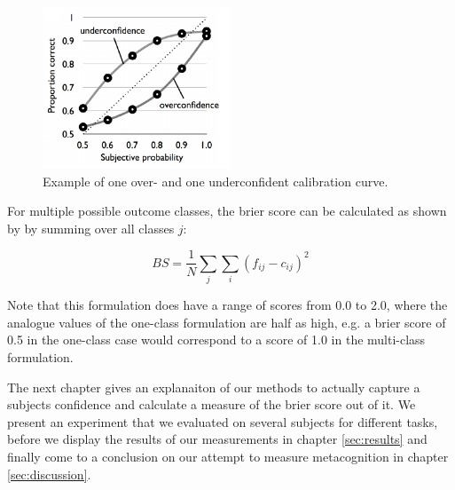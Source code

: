 \documentclass[../main/main.tex]{subfiles}
\begin{document}
	\begin{figure}[H]
		\centering
		\captionsetup{justification=centering}
		\includegraphics[width=0.5\textwidth]{../assets/calibration_curve.png}
		\caption{Example of one over- and one underconfident calibration curve.} 
		\label{fig:calibration}
	\end{figure}

	\noindent For multiple possible outcome classes, the brier score can be calculated as shown by \citep{brier1950verification} by summing over all classes $j$:
	
	\begin{equation}
		\label{eq:brier_score}
		BS = \frac{1}{N}\sum_j\sum_i(f_{ij} - c_{ij})^2
	\end{equation}
	
	\noindent Note that this formulation does have a range of scores from 0.0 to 2.0, where the analogue values of the one-class formulation are half as high, e.g. a brier score of 0.5 in the one-class case would correspond to a score of 1.0 in the multi-class formulation.
	
	The next chapter gives an explanaiton of our methods to actually capture a subjects confidence and calculate a measure of the brier score out of it. We present an experiment that we evaluated on several subjects for different tasks, before we display the results of our measurements in chapter \ref{sec:results} and finally come to a conclusion on our attempt to measure metacognition in chapter \ref{sec:discussion}.
	
\end{document}
